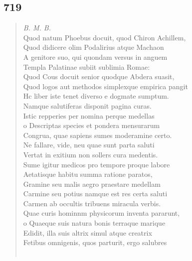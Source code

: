 \documentclass[11pt, a4paper]{report}
\begin{document}
            \subsection*{719}
      \begin{verse}
      \textit{B. M. B.} \\ Quod natum Phoebus docuit, quod Chiron Achillem, \\ Quod didicere olim Podalirius atque Machaon \\ A genitore suo, qui quondam versus in anguem \\ Templa Palatinae subiit sublimia Romae: \\ Quod Cous docuit senior quodque Abdera suasit, \\ Quod logos aut methodos simplexque empirica pangit \\ Hc liber iste tenet diverso e dogmate sumptum. \\ Namque salutiferas disponit pagina curas. \\ Istic repperies per nomina perque medellas \\ o Descriptas species et pondera mensurarum \\ Congrua, quae sapiens sumes moderamine certo. \\ Ne fallare, vide, neu quae sunt parta saluti \\ Vertat in exitium non sollers cura medentis. \\ Sume igitur medicos pro tempore proque labore \\ Aetatisque habitu summa ratione paratos, \\ Gramine seu malis aegro praestare medellam \\ Carmine seu potius namque est res certa saluti \\ Carmen ab occultis tribuens miracula verbis. \\ Quae curis hominnm physicorum inventa pararunt, \\ o Quaeque suis natura bonis terraque marique \\ Edidit, illa suis altrix simul atque creatrix \\ Fetibus omnigenis, quos parturit, ergo salubres \\ 
        ﻿\pagebreak 

\end{verse}
\end{document}
